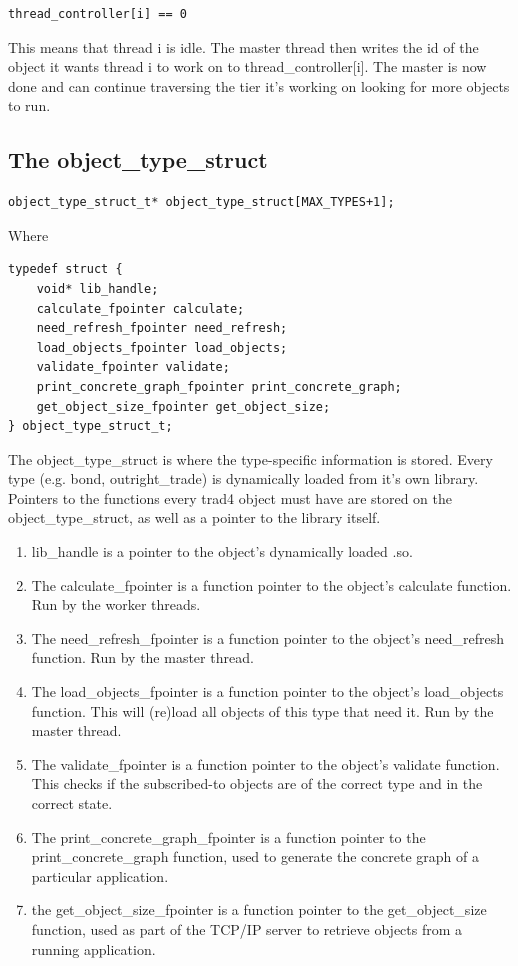 \documentclass{report}
\begin{document}
\begin{verbatim}
thread_controller[i] == 0
\end{verbatim}

This means that thread i is idle. The master thread then writes the id of the object it wants thread i to work on to thread_controller[i]. The master is now done and can continue traversing the tier it's working on looking for more objects to run. 

\subsection{The object_type_struct}

\begin{verbatim}
object_type_struct_t* object_type_struct[MAX_TYPES+1];
\end{verbatim}

Where

\begin{verbatim}
typedef struct {
    void* lib_handle;
    calculate_fpointer calculate;
    need_refresh_fpointer need_refresh;
    load_objects_fpointer load_objects;
    validate_fpointer validate;
    print_concrete_graph_fpointer print_concrete_graph;
    get_object_size_fpointer get_object_size;
} object_type_struct_t;
\end{verbatim}

The object_type_struct is where the type-specific information is stored. Every type (e.g. bond, outright_trade) is dynamically loaded from it's own library. Pointers to the functions every trad4 object must have are stored on the object_type_struct, as well as a pointer to the library itself.  

\begin{enumerate}
\item lib_handle is a pointer to the object's dynamically loaded .so.
\item The calculate_fpointer is a function pointer to the object's calculate function. Run by the worker 
threads.
\item The need_refresh_fpointer is a function pointer to the object's need_refresh function. Run by the master thread.
\item The load_objects_fpointer is a function pointer to the object's load_objects function. This will (re)load all objects of this type that need it. Run by the master thread.
\item The validate_fpointer is a function pointer to the object's validate function. This checks if the subscribed-to objects are of the correct type and in the correct state.
\item The print_concrete_graph_fpointer is a function pointer to the print_concrete_graph function, used to generate the concrete graph of a particular application.
\item the get_object_size_fpointer is a function pointer to the get_object_size function, used as part of the TCP/IP server to retrieve objects from a running application.
\end{enumerate}
\end{document}
